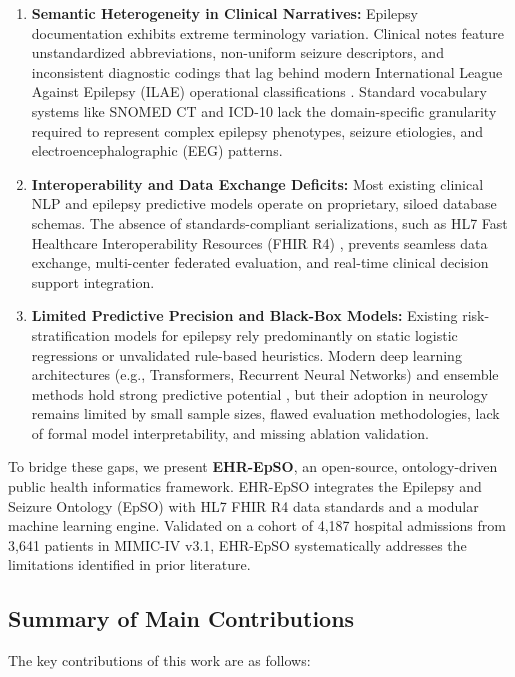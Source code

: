 \documentclass[11pt,a4paper]{article}
\begin{document}
\begin{enumerate}[label=\textbf{Gap \arabic*:}, leftmargin=*, itemsep=0.3em]
    \item \textbf{Semantic Heterogeneity in Clinical Narratives:} Epilepsy documentation exhibits extreme terminology variation. Clinical notes feature unstandardized abbreviations, non-uniform seizure descriptors, and inconsistent diagnostic codings that lag behind modern International League Against Epilepsy (ILAE) operational classifications \cite{fisher2017operational}. Standard vocabulary systems like SNOMED CT and ICD-10 lack the domain-specific granularity required to represent complex epilepsy phenotypes, seizure etiologies, and electroencephalographic (EEG) patterns.
    \item \textbf{Interoperability and Data Exchange Deficits:} Most existing clinical NLP and epilepsy predictive models operate on proprietary, siloed database schemas. The absence of standards-compliant serializations, such as HL7 Fast Healthcare Interoperability Resources (FHIR R4) \cite{hl7fhirr4}, prevents seamless data exchange, multi-center federated evaluation, and real-time clinical decision support integration.
    \item \textbf{Limited Predictive Precision and Black-Box Models:} Existing risk-stratification models for epilepsy rely predominantly on static logistic regressions or unvalidated rule-based heuristics. Modern deep learning architectures (e.g., Transformers, Recurrent Neural Networks) and ensemble methods hold strong predictive potential \cite{rajkomar2018scalable, vaswani2017attention}, but their adoption in neurology remains limited by small sample sizes, flawed evaluation methodologies, lack of formal model interpretability, and missing ablation validation.
\end{enumerate}

To bridge these gaps, we present \textbf{EHR-EpSO}, an open-source, ontology-driven public health informatics framework. EHR-EpSO integrates the Epilepsy and Seizure Ontology (EpSO) \cite{buccella2011ontology, larson2013neurolex} with HL7 FHIR R4 data standards and a modular machine learning engine. Validated on a cohort of 4,187 hospital admissions from 3,641 patients in MIMIC-IV v3.1, EHR-EpSO systematically addresses the limitations identified in prior literature.

\subsection{Summary of Main Contributions}
The key contributions of this work are as follows:
\end{document}
